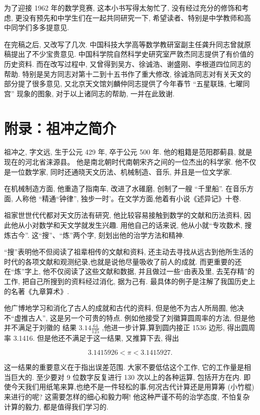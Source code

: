 \documentclass{ctexart}
\begin{document}
为了迎接 1962 年的数学竞赛, 这本小书写得太匆忙了, 没有经过充分的修饰和考虑, 更没有预先和中学生们在一起共同研究一下, 希望读者、特别是中学教师和高中同学们多多提意见.


在完稿之后, 又改写了几次. 中国科技大学高等数学教研室副主任龚升同志曾就原稿提出了不少宝贵意见. 中国科学院自然科学史研究室严敦杰同志提供了有价值的历史资料. 而在改写过程中, 又曾得到吴方、徐诚浩、谢盛刚、李根道四位同志的帮助. 特别是吴方同志对第十二到十五书作了重大修改, 徐诚浩同志对有关天文的部分提了很多意见, 又北京天文馆刘麟仲同志提供了今年春节 “五星联珠, 七曜同宫” 现象的图象, 对于以上诸同志的帮助, 一并在此致谢.



\section{附录：祖冲之简介}

祖冲之, 字文远, 生于公元 429 年, 卒于公元 500 年. 他的粗籍是范阳郡蓟县, 就是现在的河北省涞源县。 他是南北朝时代南朝宋齐之间的一位杰出的科学家. 他不仅是一位数学家, 同时还通晓天文历法、机械制造、音乐, 并且是一位文学家.

在机械制造方面, 他重造了指南车, 改进了水碓磨, 创制了一艘 “千里船”. 在音乐方面, 人称他 “精通“钟律”, 独步一时’。在文学方面,他着有小说《述异记》十卷.

祖家世世代代都对天文历法有研究, 他比较容易接触到数学的文献和历法资料, 因此他从小对数学和天文学就发生兴趣. 用他自己的话来说, 他从小就“专攻数术, 搜炼古今”. 这“搜”、“炼”两个字, 刻划出他的治学方法和精神.

“搜”表明他不但阅读了祖辈相传的文献和资料, 还主动去寻找从远古到他所生活的时代的各项文献和观测纪录,也就是说他尽量吸收了前人的成就. 而更重要的还在“炼”字上, 他不仅阅读了这些文献和数据, 并且做过一些“由表及里, 去芜存精”的工作, 把自己所搜到的资料经过消化, 据为己有. 最具体的例子是注解了我国历史上的名著《九章算术》.

他广博地学习和消化了古人的成就和古代的资料, 但是他不为古人所局囿, 他决不“虚推古人”, 这是另一个可贵的特点. 例如他接受了刘徽算圆周率的方法, 但是他并不满足于刘徽的 结果  \(3.14\frac{64}{125}\) ,他进一步计算,算到圆内接正 1536 边形, 得出圆周率 3.1416. 但是他还不满足于这一结果, 又推算下去, 得出

\[
{3.1415926} < \pi < {3.1415927}\text{.}
\]

这一结果的重要意义在于指出误差范围. 大家不要低估这个工作, 它的工作量是相当巨大的. 至少要对 9 位数字反复进行 130 次以上的各种运算, 包括开方在内. 即使今天我们用纸笔来算,也绝不是一件轻松的事,何况古代计算还是用算筹 (小竹棍) 来进行的呢? 这需要怎样的细心和毅力啊! 他这种严谨不苟的治学态度, 不怕复杂计算的毅力, 都是值得我们学习的.
\end{document}
